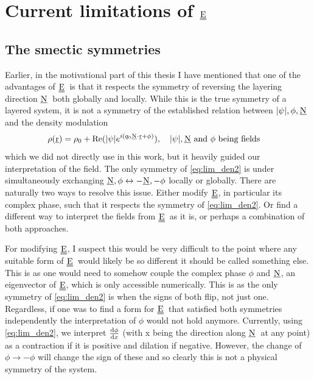 \documentclass[12pt]{article}
\newcommand{\suf}[2]{\stackunder[1pt]{#1}{\rule{\widthof{#2}*\real{1.1}}{.1ex}}}
\newcommand{\duf}[2]{\stackunder[1pt]{\suf{#1}{#2}}{\rule{\widthof{#2}*\real{1.1}}{.1ex}}}
\newcommand{\su}[1]{\suf{#1}{#1}}
\newcommand{\du}[1]{\duf{#1}{#1}}
\newcommand{\ssu}[1]{\scriptsize\su{#1}\normalsize}
\newcommand{\NN}{$\su{N}$}
\newcommand{\EE}{$\du{E}$}
\begin{document}
\section{Current limitations of \EE}
\subsection{The smectic symmetries}
Earlier, in the motivational part of this thesis I have mentioned that one of the advantages of \EE\ is that it respects the symmetry of reversing the layering direction \NN\ both globally and locally.
While this is the true symmetry of a layered system, it is not a symmetry of the established relation between $|\psi|,\phi,\su{N}$ and the density modulation
\begin{equation}\label{eq:lim_den2}
    \rho(\su{r}) = \rho_0 + \Re(|\psi| e^{i(q_0\ssu{N}\cdot\ssu{r} + \phi)}), \qq{$|\psi|,\su{N}$ and $\phi$ being fields}
\end{equation}
which we did not directly use in this work, but it heavily guided our interpretation of the field.
The only symmetry of \cref{eq:lim_den2} is under simultaneously exchanging $\su{N}, \phi \leftrightarrow -\su{N}, -\phi$ locally or globally.
There are naturally two ways to resolve this issue.
Either modify \EE, in particular its complex phase, such that it respects the symmetry of \cref{eq:lim_den2}.
Or find a different way to interpret the fields from \EE\ as it is, or perhaps a combination of both approaches.

For modifying \EE, I suspect this would be very difficult to the point where any suitable form of \EE\ would likely be so different it should be called something else.
This is as one would need to somehow couple the complex phase $\phi$ and \NN, an eigenvector of \EE, which is only accessible numerically.
This is as the only symmetry of \cref{eq:lim_den2} is when the signs of both flip, not just one.
Regardless, if one was to find a form for \EE\ that satisfied both symmetries independently the interpretation of $\phi$ would not hold anymore.
Currently, using \cref{eq:lim_den2}, we interpret $\dv{\phi}{x}$ (with x being the direction along \NN\ at any point) as a contraction if it is positive and dilation if negative.
However, the change of $\phi \rightarrow -\phi$ will change the sign of these and so clearly this is not a physical symmetry of the system.
\end{document}
